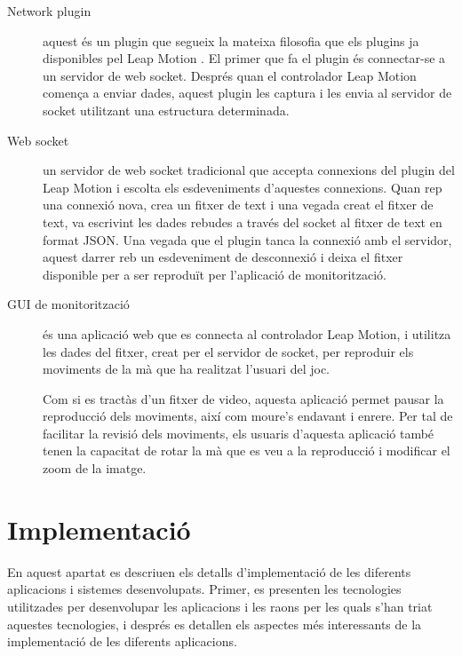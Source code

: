 \documentclass[12pt,a4paper,catalan]{article}
\begin{document}
	\begin{description}
		\item[Network plugin] aquest és un plugin que segueix la mateixa filosofia que els plugins ja disponibles pel Leap Motion \cite{leapjsplugins}. El primer que fa el plugin és connectar-se a un servidor de web socket. Després quan el controlador Leap Motion comença a enviar dades, aquest plugin les captura i les envia al servidor de socket utilitzant una estructura determinada.
		\item[Web socket] un servidor de web socket tradicional que accepta connexions del plugin del Leap Motion i escolta els esdeveniments d'aquestes connexions. Quan rep una connexió nova, crea un fitxer de text i una vegada creat el fitxer de text, va escrivint les dades rebudes a través del socket al fitxer de text en format JSON. Una vegada que el plugin tanca la connexió amb el servidor, aquest darrer reb un esdeveniment de desconnexió i deixa el fitxer disponible per a ser reproduït per l'aplicació de monitorització.
		\item[GUI de monitorització] és una aplicació web que es connecta al controlador Leap Motion, i utilitza les dades del fitxer, creat per el servidor de socket, per reproduir els moviments de la mà que ha realitzat l'usuari del joc.
		
		Com si es tractàs d'un fitxer de video, aquesta aplicació permet pausar la reproducció dels moviments, així com moure's endavant i enrere. Per tal de facilitar la revisió dels moviments, els usuaris d'aquesta aplicació també tenen la capacitat de rotar la mà que es veu a la reproducció i modificar el zoom de la imatge.
	\end{description}
	\section{Implementació}
	En aquest apartat es descriuen els detalls d'implementació de les diferents aplicacions i sistemes desenvolupats.
	Primer, es presenten les tecnologies utilitzades per desenvolupar les aplicacions i les raons per les quals s'han triat aquestes tecnologies, i després es detallen els aspectes més interessants de la implementació de les diferents aplicacions.
	
\end{document}

